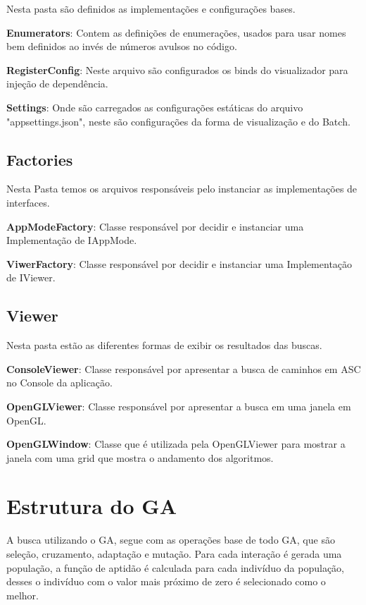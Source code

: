  Nesta pasta são definidos as implementações e configurações bases.
 
 \textbf{Enumerators}: Contem as definições de enumerações, usados para usar nomes bem definidos ao invés de números avulsos no código.
 
 \textbf{RegisterConfig}: Neste arquivo são configurados os binds do visualizador para injeção de dependência.
 
 \textbf{Settings}: Onde são carregados as configurações estáticas do arquivo "appsettings.json", neste são configurações da forma de visualização e do Batch.
 
 \subsection{Factories}
 
 Nesta Pasta temos os arquivos responsáveis pelo instanciar as implementações de interfaces.
 
 \textbf{AppModeFactory}: Classe responsável por decidir e instanciar uma Implementação de IAppMode.
 
 \textbf{ViwerFactory}: Classe responsável por decidir e instanciar uma Implementação de IViewer.
 
 \subsection{Viewer}
 
 Nesta pasta estão as diferentes formas de exibir os resultados das buscas.
 
 \textbf{ConsoleViewer}: Classe responsável por apresentar a busca de caminhos em ASC no Console da aplicação.
 
 \textbf{OpenGLViewer}: Classe responsável por apresentar a busca em uma janela em OpenGL.
 
 \textbf{OpenGLWindow}: Classe que é utilizada pela OpenGLViewer para mostrar a janela com uma grid que mostra o andamento dos algoritmos.
 
 \section{Estrutura do GA}
 
 A busca utilizando o GA, segue com as operações base de todo GA, que são seleção, cruzamento, adaptação e mutação. 
 Para cada interação é gerada uma população, a função de aptidão é calculada para cada indivíduo da população, 
 desses o indivíduo com o valor mais próximo de zero é selecionado como o melhor.
 
